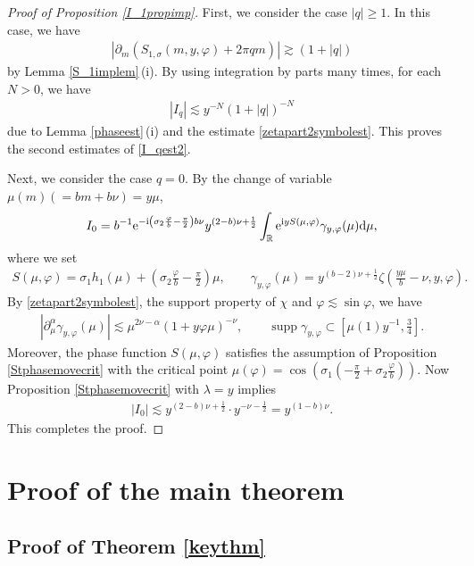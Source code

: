 \documentclass[pdftex]{sigma}
\numberwithin{equation}{section}
\def\R{\mathbb{R}}%
\DeclareMathOperator{\supp}{supp}%
\def\a{\alpha}
\def\c{\gamma}
\def\f{\varphi}
\def\l{\lambda}
\def\m{\mu}
\def\n{\nu}
\def\s{\sigma}
\def\z{\zeta}
\def\pa{\partial}
\begin{document}
\begin{proof}[Proof of Proposition \ref{I_1propimp}]
First, we consider the case $|q|\geq 1$. In this case, we have
\begin{align*}
|\pa_m(S_{1,\s}(m,y,\f)+2\pi qm)|\gtrsim (1+|q|)
\end{align*}
by Lemma \ref{S_1implem}\,(i).
By using integration by parts many times, for each $N>0$, we have
\begin{align*}
|I_q|\lesssim y^{-N}(1+|q|)^{-N}
\end{align*}
due to Lemma \ref{phaseest}\,(i) and the estimate \eqref{zetapart2symbolest}.
This proves the second estimates of \eqref{I_qest2}.

Next, we consider the case $q=0$. By the change of variable $\m(m)(=bm+b\n)=y\m$,
\[%
I_0=b^{-1}{\rm e}^{-{\rm i}\left(\s_2\frac{\f}{b}-\frac{\pi}{2}\right)b\n} y^{(2-b)\n+\frac{1}{2}}\int_{\R}{\rm e}^{{\rm i}yS(\m,\f) }\c_{y,\f}(\m) {\rm d}\m,
\]
where we set
\begin{align*}
S(\m,\f)=\s_1h_1(\m) +\left(\s_2\frac{\f}{b}-\frac{\pi}{2}\right)\m,\qquad \c_{y,\f}(\m)=y^{(b-2)\n+\frac{1}{2}}\z\left(\frac{y\m}{b}-\n,y,\f\right).
\end{align*}
By \eqref{zetapart2symbolest}, the support property of $\chi$ and $\f\lesssim\sin \f$, we have
\begin{align*}
|\pa_{\m}^{\a}\c_{y,\f}(\m)|\lesssim \m^{2\n-\a}(1+y \f\m)^{-\n},\qquad \supp \c_{y,\f}\subset \left[\m(1)y^{-1},\frac{3}{4}\right].
\end{align*}
Moreover, the phase function $S(\m,\f)$ satisfies the assumption of Proposition \ref{Stphasemovecrit} with the critical point $\m(\f)=\cos\left(\s_1\left(-\frac{\pi}{2}+\s_2\frac{\f}{b}\right)\right)$.
Now Proposition \ref{Stphasemovecrit} with $\l=y$ implies
\begin{align*}
|I_0|\lesssim y^{(2-b)\n+\frac{1}{2}}\cdot y^{-\n-\frac{1}{2}}=y^{(1-b)\n}.
\end{align*}
This completes the proof.
\end{proof}





\section{Proof of the main theorem}\label{proofsection}





\subsection{Proof of Theorem \ref{keythm}}
\label{subsec:proof}
\end{document}
